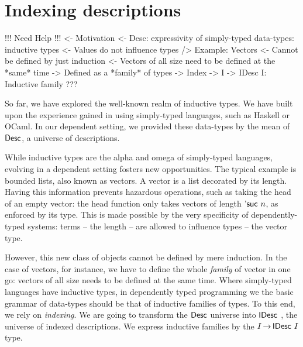 \section{Indexing descriptions}
\label{sec:indexing-desc}

\begin{wstructure}
!!! Need Help !!!
<- Motivation
    <- Desc: expressivity of simply-typed data-types: inductive types
        <- Values do not influence types
    /> Example: Vectors
        <- Cannot be defined by just induction
            <- Vectors of all size need to be defined at the *same* time
            -> Defined as a *family* of types
                -> Index
        -> I -> IDesc I: Inductive family
    ???
\end{wstructure}


So far, we have explored the well-known realm of inductive types. We
have built upon the experience gained in using simply-typed languages,
such as Haskell or OCaml. In our dependent setting, we provided these
data-types by the mean of $\Desc$, a universe of descriptions. 

While inductive types are the alpha and omega of simply-typed
languages, evolving in a dependent setting fosters new
opportunities. The typical example is bounded lists, also known as
vectors. A vector is a list decorated by its length. Having this
information prevents hazardous operations, such as taking the head of
an empty vector: the head function only takes vectors of length
$\NatSuc{n}$, as enforced by its type. This is made possible by the
very specificity of dependently-typed systems: terms -- the length --
are allowed to influence types -- the vector type. 

However, this new class of objects cannot be defined by mere
induction. In the case of vectors, for instance, we have to define the
whole \emph{family} of vector in one go: vectors of all size needs to
be defined at the same time. Where simply-typed languages have
inductive types, in dependently typed programming we the basic grammar of
data-types should be that of inductive families of types. To this end, we
rely on \emph{indexing}. We are going to transform the $\Desc$ universe into
$\IDesc$, the universe of indexed descriptions. We express inductive families
by the $I \To \IDesc{I}$ type.   


